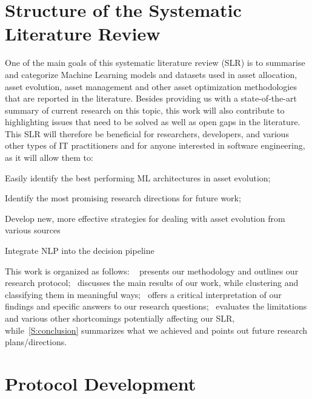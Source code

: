 \documentclass[11pt]{article}
\newenvironment{paraenum}{\begin{inparaenum}[\itshape a)\upshape]}{\end{inparaenum}}
\begin{document}
\section{Structure of the Systematic Literature Review} \label{S:StructureSLR}
 One of the main goals of this systematic literature review (SLR) is to summarise and categorize Machine Learning models and datasets used in asset allocation, asset evolution, asset management and other asset optimization methodologies that are reported in the literature.
 Besides providing us with a state-of-the-art summary of current research on this topic, this work will also contribute to highlighting issues that need to be solved as well as open gaps in the literature. This SLR will therefore be beneficial for researchers, developers, and various other types of IT practitioners and for anyone interested in software engineering, as it will allow them to:

\begin{paraenum} \label{E:slrObjectives}

    \item Easily identify the best performing ML architectures in asset evolution;

    \item Identify the most promising research directions for future work;

    \item Develop new, more effective strategies for dealing with asset evolution from various sources

    \item Integrate NLP into the decision pipeline

\end{paraenum}

This work is organized as follows: ~ presents our methodology and outlines our research protocol;~ discusses the main results of our work, while clustering and classifying them in meaningful ways;~ offers a critical interpretation of our findings and specific answers to our research questions;~ evaluates the limitations and various other shortcomings potentially affecting our SLR, while~\cref{S:conclusion} summarizes what we achieved and points out future research plans/directions.

\section{Protocol Development} \label{S:protocolDevelopment}
\end{document}
